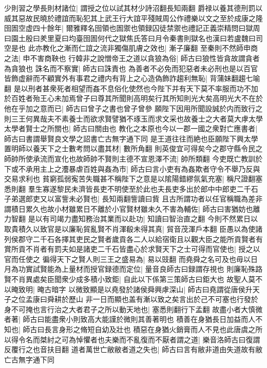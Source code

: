 少則習之學長則材諸位|{
	謂授之位以試其材少詩沼翻長知兩翻}
爵禄以養其德刑罰以威其惡故民曉於禮誼而恥犯其上武王行大誼平殘賊周公作禮樂以文之至於成康之隆囹圄空虚四十餘年|{
	爾雅釋名囹領也圄禦也領録囚徒禁禦也禮記正義崇精問曰獄周曰園土殷曰羑里夏曰均臺囹圄何代之獄焦氏答曰月令秦書則獄名也漢曰若盧魏曰司空是也}
此亦教化之漸而仁誼之流非獨傷肌膚之效也|{
	漸子廉翻}
至秦則不然師申商之法|{
	申不害商鞅也}
行韓非之說憎帝王之道以貪狼為俗|{
	師古曰狼性皆貪故謂貪者為貪狼也}
誅名而不察實|{
	師古曰誅責也}
為善者不必免而犯惡者未必刑也是以百官皆飾虚辭而不顧實外有事君之禮内有背上之心造偽飾詐趨利無恥|{
	背蒲妹翻趨七喻翻}
是以刑者甚衆死者相望而姦不息俗化使然也今陛下并有天下莫不率服而功不加於百姓者殆王心未加焉曾子曰尊其所聞則高明矣行其所知則光大矣高明光大不在於他在乎加之意而已|{
	師古曰曾子之書也曾子曾參}
願陛下因用所聞設誠於内而致行之則三王何異哉夫不素養士而欲求賢譬猶不琢玉而求文采也故養士之大者莫大虖太學太學者賢士之所關也|{
	師古曰關由也}
教化之本原也今以一郡一國之衆對亡應書者|{
	師古曰書謂舉賢良文學之詔書亡古無字通下同}
是王道往往而絶也臣願陛下興太學置明師以養天下之士數考問以盡其材|{
	數所角翻}
則英俊宜可得矣今之郡守縣令民之師帥所使承流而宣化也故師帥不賢則主德不宣恩澤不流|{
	帥所類翻}
今吏既亡教訓於下或不承用主上之灋暴虐百姓與姦為市|{
	師古曰言小吏有為姦欺者守令不舉乃反與交易求利也}
貧窮孤弱寃苦失職甚不稱陛下之意是以隂陽錯繆氛氣充塞|{
	稱尺證翻塞悉則翻}
羣生寡遂黎民未濟皆長吏不明使至於此也夫長吏多出於郎中中郎吏二千石子弟選郎吏又以富訾未必賢也|{
	長知兩翻訾讀曰貲}
且古所謂功者以任官稱職為差非謂積日累久也故小材雖累日不離於小官賢材雖未久不害為輔佐|{
	師古曰害猶妨也離力智翻}
是以有司竭力盡知務治其業而以赴功|{
	知讀曰智治直之翻}
今則不然累日以取貴積久以致官是以廉恥貿亂賢不肖渾殽未得其真|{
	貿音茂渾戶本翻}
臣愚以為使諸列侯郡守二千石各擇其吏民之賢者歲貢各二人以給宿衛且以觀大臣之能所貢賢者有賞所貢不肖者有罰夫如是諸吏二千石皆盡心於求賢天下之士可得而官使也|{
	授之以官而任使之}
徧得天下之賢人則三王之盛易為|{
	易以豉翻}
而堯舜之名可及也毋以日月為功實試賢能為上量材而授官録德而定位|{
	量音良師古曰録謂存視也}
則廉恥殊路賢不肖異處矣臣聞衆少成多積小致鉅|{
	自此以下係第三策師古曰鉅大也}
故聖人莫不以晻致明|{
	晻古暗字}
以微致顯是以堯發於諸侯舜興虖深山|{
	師古曰堯謂從唐侯升天子之位孟康曰舜耕於歷山}
非一日而顯也盖有漸以致之矣言出於己不可塞也行發於身不可掩也言行治之大者君子之所以動天地也|{
	塞悉則翻行下孟翻}
故盡小者大慎微者著|{
	師古曰能盡衆小則致高大能謹於微則其善著明也}
積善在身猶長日加益而人不知也|{
	師古曰長言身形之脩短自幼及壯也}
積惡在身猶火銷膏而人不見也此唐虞之所以得令名而桀紂之可為悼懼者也夫樂而不亂復而不厭者謂之道|{
	樂音洛師古曰復謂反覆行之也音扶目翻}
道者萬世亡敝敝者道之失也|{
	師古曰言有敝非道由失道故有敝亡古無字通下同}
